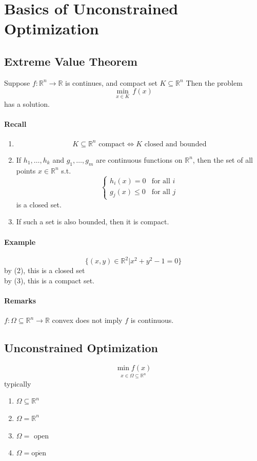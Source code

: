 \documentclass[11pt]{article}
\newcommand{\real}[0]{\mathbb{R}}
\begin{document}
\section{Basics of Unconstrained Optimization}
\subsection{Extreme Value Theorem}
Suppose $f: \real^n \rightarrow \real$ is continues, and compact set $K \subseteq \real^n$
Then the problem
$$\underset{x \in K}{\min} \, f(x)$$ has a solution.

\paragraph{Recall}
\begin{enumerate}
	\item $$K \subseteq \real^n \text{ compact} \iff K \text{ closed and bounded}$$
	\item If $h_1, \hdots, h_k$ and $g_1, \hdots, g_m$ are continuous functions on $\real^n$, then the set of all points $x \in \real^n$ s.t.
	$$\begin{cases}
		h_i(x) = 0  &\text{for all $i$} \\
		g_j(x) \leq 0 &\text{for all $j$}
	\end{cases}$$
	is a closed set.
	\item If such a set is also bounded, then it is compact.
\end{enumerate}

\paragraph{Example}
$$\{(x,y) \in \real^2 | x^2 + y^2 -1 = 0 \}$$
by (2), this is a closed set \\
by (3), this is a compact set.

\paragraph{Remarks}
$f: \Omega \subseteq \real^n \rightarrow \real$ convex does not imply $f$ is continuous.

\subsection{Unconstrained Optimization}
$$\underset{x \in \Omega \subseteq \real^n}{\min f(x)}$$
typically
\begin{enumerate}
	\item $\Omega \subseteq \real^n$
	\item $\Omega = \real^n$
	\item $\Omega = $ open
	\item $\Omega = \overline{\text{open}}$ 
\end{enumerate}
\end{document}
